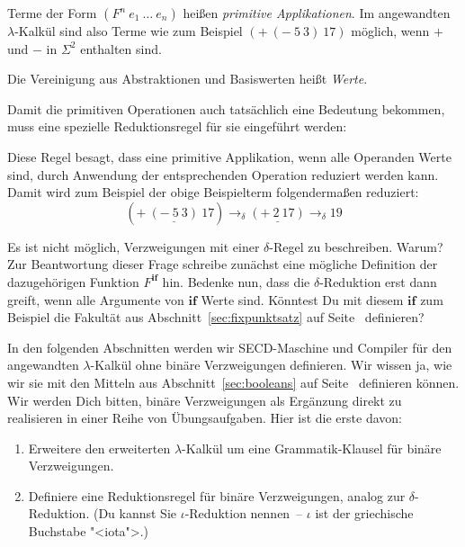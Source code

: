 Terme der Form $(F^n~e_1~\ldots~e_n)$ heißen
\textit{primitive Applikationen}.
Im angewandten $\lambda$-Kalkül sind also
Terme wie zum Beispiel $(+~(-~5~3)~17)$ möglich, wenn $+$ und $-$ in
$\Sigma^2$ enthalten sind.
%
\begin{definition}\label{def:wert-angewandt}
  Die Vereinigung aus Abstraktionen und
  Basiswerten heißt \textit{Werte}.
\end{definition}
%
Damit die primitiven Operationen auch tatsächlich eine Bedeutung
bekommen, muss eine spezielle Reduktionsregel für sie eingeführt
werden:
%
\vspace{-1ex}
%
Diese Regel besagt, dass eine primitive Applikation, wenn alle
Operanden Werte sind, durch Anwendung der entsprechenden Operation 
reduziert werden kann.  Damit wird zum Beispiel der
obige Beispielterm folgendermaßen reduziert:
%
\begin{displaymath}
  (+~\underline{(-~5~3)}~17) \rightarrow_{\delta} \underline{(+~2~17)} \rightarrow_{\delta} 19
\end{displaymath}
%
\begin{aufgabeinline}
  Es ist nicht möglich, Verzweigungen mit einer
  $\delta$-Regel zu beschreiben.  Warum?  Zur Beantwortung dieser
  Frage schreibe zunächst eine mögliche Definition der dazugehörigen
  Funktion $F^$ hin.  Bedenke nun, dass die
  $\delta$-Reduktion erst dann greift, wenn alle Argumente von
  $$ Werte sind.  Könntest Du mit diesem $$ zum
  Beispiel die Fakultät aus Abschnitt~\ref{sec:fixpunktsatz} auf
  Seite~\pageref{sec:fixpunktsatz} definieren?
\end{aufgabeinline}
%
In den folgenden Abschnitten werden wir SECD-Maschine und Compiler
für den angewandten $\lambda$-Kalkül ohne binäre Verzweigungen
definieren.  Wir wissen ja, wie wir sie mit den Mitteln aus
Abschnitt~\ref{sec:booleans} auf Seite~\pageref{sec:booleans}
definieren können.
Wir werden Dich bitten, binäre Verzweigungen als Ergänzung
direkt zu realisieren in einer Reihe von Übungsaufgaben.  Hier ist die
erste davon:
%
\begin{aufgabeinline}
  \begin{enumerate}
  \item Erweitere den erweiterten $\lambda$-Kalkül um eine
    Grammatik-Klausel für binäre Verzweigungen.
  \item Definiere eine Reduktionsregel für binäre Verzweigungen,
    analog zur $\delta$-Reduktion.  (Du kannst Sie $\iota$-Reduktion
    nennen~-- $\iota$ ist der griechische Buchstabe "<iota">.)
  \end{enumerate}
\end{aufgabeinline}

